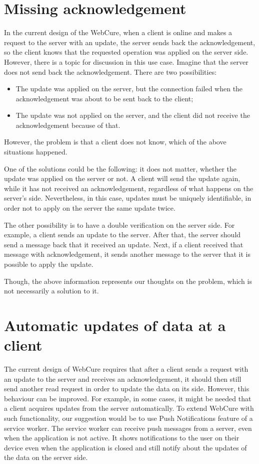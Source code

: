 \section*{Missing acknowledgement}

In the current design of the WebCure, when a client is online and makes a request to the server with an update, the server sends back the acknowledgement, so the client knows that the requested operation was applied on the server side. However, there is a topic for discussion in this use case. Imagine that the server does not send back the acknowledgement. There are two possibilities:

\begin{itemize}
    \item {The update was applied on the server, but the connection failed when the acknowledgement was about to be sent back to the client;}
    \item {The update was not applied on the server, and the client did not receive the acknowledgement because of that.}
\end{itemize}

However, the problem is that a client does not know, which of the above situations happened. 

One of the solutions could be the following: it does not matter, whether the update was applied on the server or not. A client will send the update again, while it has not received an acknowledgement, regardless of what happens on the server's side. Nevertheless, in this case, updates must be uniquely identifiable, in order not to apply on the server the same update twice.

The other possibility is to have a double verification on the server side. For example, a client sends an update to the server. After that, the server should send a message back that it received an update. Next, if a client received that message with acknowledgement, it sends another message to the server that it is possible to apply the update. 

Though, the above information represents our thoughts on the problem, which is not necessarily a solution to it.  

\section*{Automatic updates of data at a client}

The current design of WebCure requires that after a client sends a request with an update to the server and receives an acknowledgement, it should then still send another read request in order to update the data on its side. However, this behaviour can be improved. For example, in some cases, it might be needed that a client acquires updates from the server automatically. To extend WebCure with such functionality, our suggestion would be to use Push Notifications feature\cite{32} of a service worker. The service worker can receive push messages from a server, even when the application is not active. It shows notifications to the user on their device even when the application is closed and still notify about the updates of the data on the server side.

